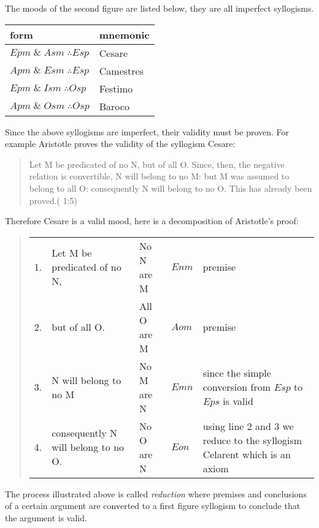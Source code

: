\documentclass[12pt]{article}
\begin{document}
The moods of the second figure are listed below, they are all imperfect syllogisms.
\begin{center}
\begin{tabular}{l l}
\textbf{form} & \textbf{mnemonic}\\
\hline
$Epm \;\&\; Asm\;\therefore Esp$ & Cesare\\
$Apm \;\&\; Esm\;\therefore Esp$ & Camestres\\
$Epm \;\&\; Ism\;\therefore Osp$ & Festimo\\
$Apm \;\&\; Osm\;\therefore Osp$ & Baroco
\end{tabular}
\end{center}
Since the above syllogisms are imperfect, their  validity must be proven.  For example Aristotle proves the validity of the syllogism Cesare:
\begin{quote}
Let M be predicated of no N, but of all O. Since, then, the negative relation is convertible, N will belong to no M: but M was assumed to belong to all O: consequently N will belong to no O. This has already been proved.(\cite{AP} 1:5)
\end{quote}
Therefore Cesare is a valid mood, here is a decomposition of Aristotle's proof:\\
\begin{quote}
\begin{tabular}{l l l l l}
1. & Let M be predicated of no N, & No N are M & $Enm$ & premise\\
2. & but of all O. & All O are M & $Aom$ & premise\\
3. & N will belong to no M & No M are N & $Emn$ & since the simple conversion from $Esp$ to $Eps$ is valid\\
4. & consequently N will belong to no O. & No O are N & $Eon$ & using line 2 and 3 we reduce to the syllogism Celarent which is an axiom\\
\end{tabular}
\end{quote}
The process illustrated above is called \emph{reduction} where premises and conclusions of a certain argument are converted to a first figure syllogism to conclude that the argument is valid.
\end{document}

